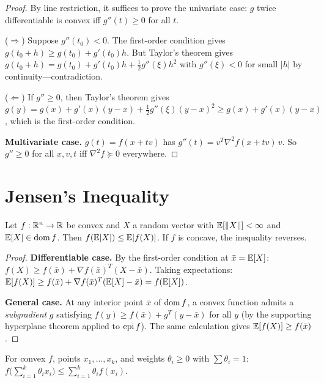 \documentclass[11pt,a4paper]{article}
\begin{document}
\begin{proof}
By line restriction, it suffices to prove the univariate case: $g$ twice
differentiable is convex iff $g''(t) \ge 0$ for all $t$.

($\Rightarrow$)  Suppose $g''(t_0) < 0$.  The first-order condition gives
$g(t_0 + h) \ge g(t_0) + g'(t_0) h$.  But Taylor's theorem gives
$g(t_0 + h) = g(t_0) + g'(t_0) h + \frac{1}{2} g''(\xi) h^2$ with
$g''(\xi) < 0$ for small $|h|$ by continuity---contradiction.

($\Leftarrow$)  If $g'' \ge 0$, then Taylor's theorem gives
$g(y) = g(x) + g'(x)(y-x) + \frac{1}{2} g''(\xi)(y-x)^2 \ge
g(x) + g'(x)(y-x)$, which is the first-order condition.

\textbf{Multivariate case.}  $g(t) = f(x + tv)$ has
$g''(t) = v^T \nabla^2 f(x+tv)\, v$.  So $g'' \ge 0$ for all $x, v, t$ iff
$\nabla^2 f \succeq 0$ everywhere.
\end{proof}


\section{Jensen's Inequality}

\begin{theorem}
\label{thm:jensen}
Let $f : \mathbb{R}^n \to \mathbb{R}$ be convex and $X$ a random vector with
$\mathbb{E}[\|X\|] < \infty$ and $\mathbb{E}[X] \in \operatorname{dom} f$.  Then
$f(\mathbb{E}[X]) \le \mathbb{E}[f(X)]$.
If $f$ is concave, the inequality reverses.
\end{theorem}

\begin{proof}
\textbf{Differentiable case.}  By the first-order condition at
$\bar{x} = \mathbb{E}[X]$: $f(X) \ge f(\bar{x}) + \nabla f(\bar{x})^T(X - \bar{x})$.
Taking expectations: $\mathbb{E}[f(X)] \ge f(\bar{x}) +
\nabla f(\bar{x})^T(\mathbb{E}[X] - \bar{x}) = f(\mathbb{E}[X])$.

\textbf{General case.}  At any interior point $\bar{x}$ of $\operatorname{dom} f$, a convex
function admits a \emph{subgradient} $g$ satisfying $f(y) \ge f(\bar{x}) +
g^T(y - \bar{x})$ for all $y$ (by the supporting hyperplane theorem applied
to $\operatorname{epi} f$).  The same calculation gives $\mathbb{E}[f(X)] \ge f(\bar{x})$.
\end{proof}

\begin{keyresult}[title={Jensen's Inequality -- Finite Form}]
For convex $f$, points $x_1, \ldots, x_k$, and weights $\theta_i \ge 0$ with
$\sum \theta_i = 1$:
$f\bigl(\sum_{i=1}^k \theta_i x_i\bigr) \le \sum_{i=1}^k \theta_i f(x_i)$.
\end{keyresult}
\end{document}
